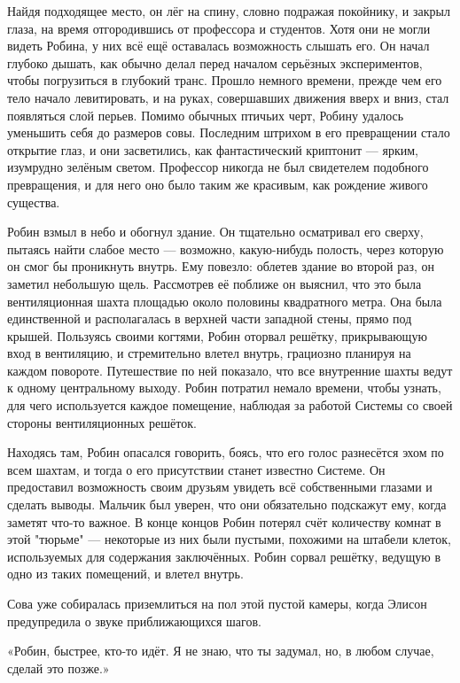 \documentclass[a5paper, 9pt,
final, openany, twoside=true]{memoir}
\begin{document}
Найдя подходящее место, он лёг на спину, словно подражая покойнику, и закрыл глаза, на время отгородившись от профессора и студентов. Хотя они не могли видеть Робина, у них всё ещё оставалась возможность слышать его. Он начал глубоко дышать, как обычно делал перед началом серьёзных экспериментов, чтобы погрузиться в глубокий транс. Прошло немного времени, прежде чем его тело начало левитировать, и на руках, совершавших движения вверх и вниз, стал появляться слой перьев. Помимо обычных птичьих черт, Робину удалось уменьшить себя до размеров совы. Последним штрихом в его превращении стало открытие глаз, и они засветились, как фантастический криптонит — ярким, изумрудно зелёным светом. Профессор никогда не был свидетелем подобного превращения, и для него оно было таким же красивым, как рождение живого существа.\bigskip

Робин взмыл в небо и обогнул здание. Он тщательно осматривал его сверху, пытаясь найти слабое место — возможно, какую-нибудь полость, через которую он смог бы проникнуть внутрь. Ему повезло: облетев здание во второй раз, он заметил небольшую щель. Рассмотрев её поближе он выяснил, что это была вентиляционная шахта площадью около половины квадратного метра. Она была единственной и располагалась в верхней части западной стены, прямо под крышей. Пользуясь своими когтями, Робин оторвал решётку, прикрывающую вход в вентиляцию, и стремительно влетел внутрь, грациозно планируя на каждом повороте. Путешествие по ней показало, что все внутренние шахты ведут к одному центральному выходу. Робин потратил немало времени, чтобы узнать, для чего используется каждое помещение, наблюдая за работой Системы со своей стороны вентиляционных решёток.

Находясь там, Робин опасался говорить, боясь, что его голос разнесётся эхом по всем шахтам, и тогда о его присутствии станет известно Системе. Он предоставил возможность своим друзьям увидеть всё собственными глазами и сделать выводы. Мальчик был уверен, что они обязательно подскажут ему, когда заметят что-то важное. В конце концов Робин потерял счёт количеству комнат в этой "тюрьме" — некоторые из них были пустыми, похожими на штабели клеток, используемых для содержания заключённых. Робин сорвал решётку, ведущую в одно из таких помещений, и влетел внутрь.\bigskip

Сова уже собиралась приземлиться на пол этой пустой камеры, когда Элисон предупредила о звуке приближающихся шагов.

«Робин, быстрее, кто-то идёт. Я не знаю, что ты задумал, но, в любом случае, сделай это позже.»
\end{document}
